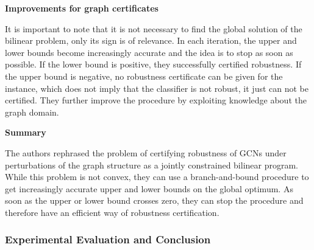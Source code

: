 \documentclass[a4paper,preprint]{sig-alternate}
\begin{document}
\textbf{Improvements for graph certificates}\newline

It is important to note that it is not necessary to find the global solution of the bilinear problem, only its sign is of relevance.
In each iteration, the upper and lower bounds become increasingly accurate and the idea is to stop as soon as possible.
If the lower bound is positive, they successfully certified robustness. If the upper bound is negative, no robustness certificate
can be given for the instance, which does not imply that the classifier is not robust, it just can not be certified.
They further improve the procedure by exploiting knowledge about the graph domain.\newline

\textbf{Summary}\newline

The authors rephrased the problem of certifying robustness of GCNs under perturbations of the graph structure
as a jointly constrained bilinear program. While this problem is not convex, they can use a branch-and-bound procedure to get increasingly
accurate upper and lower bounds on the global optimum. As soon as the upper or lower bound crosses zero, they can stop the procedure
and therefore have an efficient way of robustness certification.

\subsubsection{Experimental Evaluation and Conclusion}
\end{document}
